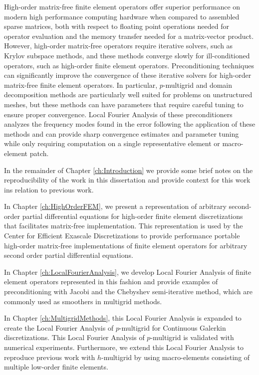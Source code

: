 High-order matrix-free finite element operators offer superior performance on modern high performance computing hardware when compared to assembled sparse matrices, both with respect to floating point operations needed for operator evaluation and the memory transfer needed for a matrix-vector product.
However, high-order matrix-free operators require iterative solvers, such as Krylov subspace methods, and these methods converge slowly for ill-conditioned operators, such as high-order finite element operators.
Preconditioning techniques can significantly improve the convergence of these iterative solvers for high-order matrix-free finite element operators.
In particular, $p$-multigrid and domain decomposition methods are particularly well suited for problems on unstructured meshes, but these methods can have parameters that require careful tuning to ensure proper convergence.
Local Fourier Analysis of these preconditioners analyzes the frequency modes found in the error following the application of these methods and can provide sharp convergence estimates and parameter tuning while only requiring computation on a single representative element or macro-element patch.

In the remainder of Chapter \ref{ch:Introduction} we provide some brief notes on the reproducibility of the work in this dissertation and provide context for this work ins relation to previous work.

In Chapter \ref{ch:HighOrderFEM}, we present a representation of arbitrary second-order partial differential equations for high-order finite element discretizations that facilitates matrix-free implementation.
This representation is used by the Center for Efficient Exascale Discretizations to provide performance portable high-order matrix-free implementations of finite element operators for arbitrary second order partial differential equations.

In Chapter \ref{ch:LocalFourierAnalysis}, we develop Local Fourier Analysis of finite element operators represented in this fashion and provide examples of preconditioning with Jacobi and the Chebyshev semi-iterative method, which are commonly used as smoothers in multigrid methods.

In Chapter \ref{ch:MultigridMethods}, this Local Fourier Analysis is expanded to create the Local Fourier Analysis of $p$-multigrid for Continuous Galerkin discretizations.
This Local Fourier Analysis of $p$-multigrid is validated with numerical experiments.
Furthermore, we extend this Local Fourier Analysis to reproduce previous work with $h$-multigrid by using macro-elements consisting of multiple low-order finite elements.


